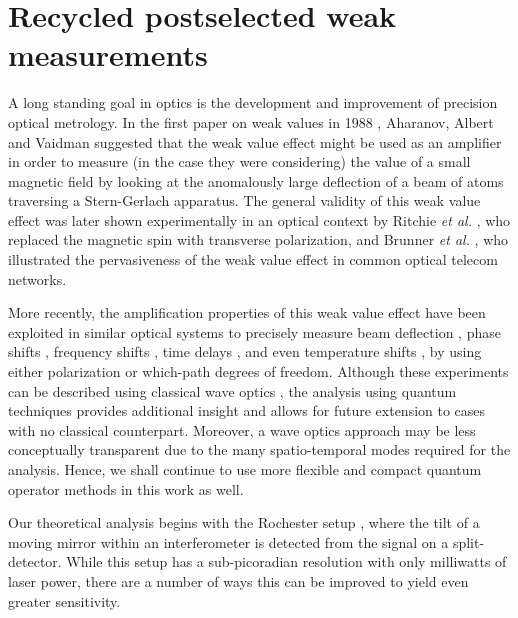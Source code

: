 \chapter[Pulsed recycling]{Recycled postselected weak measurements}\label{ch:pulsed}

A long standing goal in optics is the development and improvement of precision optical metrology.  In the first paper on weak values in 1988 \cite{Aharonov1988, Duck1989}, Aharanov, Albert and Vaidman suggested that the weak value effect might be used as an amplifier in order to measure (in the case they were considering) the value of a small magnetic field by looking at the anomalously large deflection of a beam of atoms traversing a Stern-Gerlach apparatus.  The general validity of this weak value effect was later shown experimentally in an optical context by Ritchie \emph{et al.} \cite{Ritchie1991}, who replaced the magnetic spin with transverse polarization, and Brunner \emph{et al.} \cite{Brunner2003}, who illustrated the pervasiveness of the weak value effect in common optical telecom networks.

More recently, the amplification properties of this weak value effect have been exploited in similar optical systems to precisely measure beam deflection \cite{Hosten2008,Dixon2009,Starling2009,Turner2011,Pfeifer2011,Hogan2011,Zhou2012}, phase shifts \cite{Starling2010b, Starling2010a}, frequency shifts \cite{Starling2010}, time delays \cite{Brunner2010,Strubi2013,Viza2013}, and even temperature shifts \cite{Egan2012}, by using either polarization or which-path degrees of freedom.  Although these experiments can be described using classical wave optics \cite{Howell2010}, the analysis using quantum techniques provides additional insight and allows for future extension to cases with no classical counterpart.  Moreover, a wave optics approach may be less conceptually transparent due to the many spatio-temporal modes required for the analysis.  Hence, we shall continue to use more flexible and compact quantum operator methods in this work as well.

Our theoretical analysis begins with the Rochester setup \cite{Dixon2009}, where the tilt of a moving mirror within an interferometer is detected from the signal on a split-detector.  While this setup has a sub-picoradian resolution with only milliwatts of laser power, there are a number of ways this can be improved to yield even greater sensitivity.

